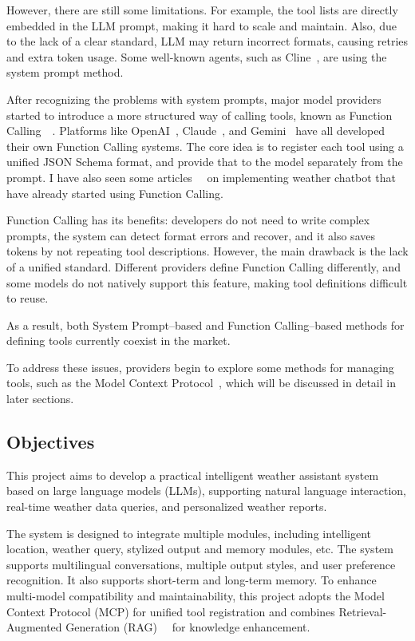 \documentclass[final-report]{report-template}
\begin{document}
However, there are still some limitations. For example, the tool lists are directly embedded in the LLM prompt, making it hard to scale and maintain. Also, due to the lack of a clear standard, LLM may return incorrect formats, causing retries and extra token usage. Some well-known agents, such as Cline~\cite{Cline2025}, are using the system prompt method.

After recognizing the problems with system prompts, major model providers started to introduce a more structured way of calling tools, known as Function Calling~\cite{Liu2024}~\cite{Gim2024}. Platforms like OpenAI~\cite{OpenAI2025}, Claude~\cite{Claude2025}, and Gemini~\cite{Gemini2025} have all developed their own Function Calling systems. The core idea is to register each tool using a unified JSON Schema format, and provide that to the model separately from the prompt. I have also seen some articles~\cite{Anthonio2024}~\cite{KermaniWeatherAgent2025} on implementing weather chatbot that have already started using Function Calling.

Function Calling has its benefits: developers do not need to write complex prompts, the system can detect format errors and recover, and it also saves tokens by not repeating tool descriptions. However, the main drawback is the lack of a unified standard. Different providers define Function Calling differently, and some models do not natively support this feature, making tool definitions difficult to reuse.

As a result, both System Prompt–based and Function Calling–based methods for defining tools currently coexist in the market.

To address these issues, providers begin to explore some methods for managing tools, such as the Model Context Protocol~\cite{Anthropic2024MCP}, which will be discussed in detail in later sections.

\subsection{Objectives}
This project aims to develop a practical intelligent weather assistant system based on large language models (LLMs), supporting natural language interaction, real-time weather data queries, and personalized weather reports.

The system is designed to integrate multiple modules, including intelligent location, weather query, stylized output and memory modules, etc. The system supports multilingual conversations, multiple output styles, and user preference recognition. It also supports short-term and long-term memory. To enhance multi-model compatibility and maintainability, this project adopts the Model Context Protocol (MCP) for unified tool registration and combines Retrieval-Augmented Generation (RAG)~\cite{Jeong2024}~\cite{GaoYunfan2023} for knowledge enhancement.
\end{document}

